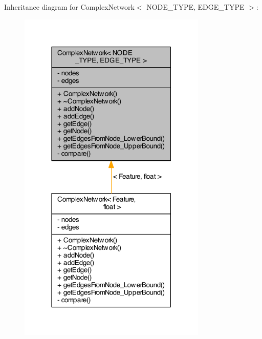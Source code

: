 Inheritance diagram for Complex\+Network$<$ N\+O\+D\+E\+\_\+\+T\+Y\+P\+E, E\+D\+G\+E\+\_\+\+T\+Y\+P\+E $>$\+:\nopagebreak
\begin{figure}[H]
\begin{center}
\leavevmode
\includegraphics[width=254pt]{class_complex_network__inherit__graph}
\end{center}
\end{figure}


